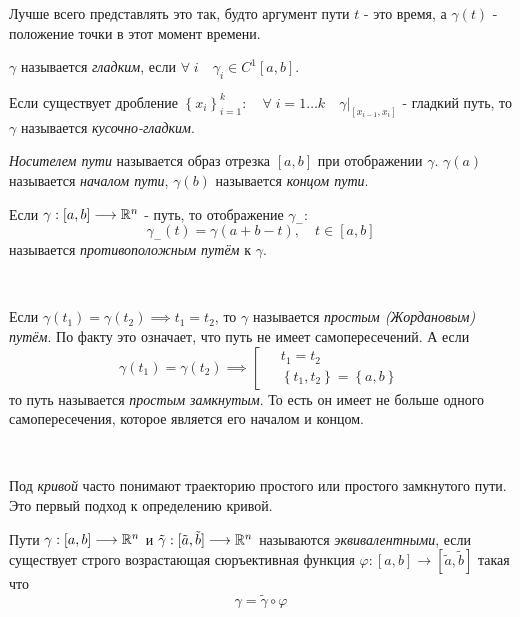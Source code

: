 \documentclass[../main.tex]{subfiles}
\begin{document}
Лучше всего представлять это так, будто аргумент пути \( t\) - это время, а \( \gamma \left( t\right)\) - положение точки в этот момент времени. 

\( \gamma \) называется \emph{гладким}, если \( \forall \;i\quad \gamma _i \in C^1\left[ a,b\right]\). 

Если существует дробление \( \left\{ x_i\right\}_{i=1}^k:\quad \forall \;i=1\dots k\quad \gamma |_{\left[ x_{i-1}, x_i\right]}\) - гладкий путь, то 
\( \gamma \) называется \emph{кусочно-гладким}.


\emph{Носителем пути} называется образ отрезка \( \left[ a,b\right]\) при отображении \( \gamma \).
\( \gamma \left( a\right)\) называется \emph{началом пути}, \( \gamma \left( b\right)\) называется \emph{концом пути}. 

Если \( \gamma :\left[ a,b\right] \longrightarrow \mathbb{R} ^n\) - путь, то отображение \( \gamma _-:\)\[\gamma _-(t)= \gamma \left( a+b-t\right),\quad t \in \left[ a,b\right]\]
называется \emph{противоположным путём} к \( \gamma \). 

~

Если \( \gamma \left( t_1\right)= \gamma \left( t_2\right) \implies t_1=t_2\), то \( \gamma \) называется \emph{простым (Жордановым) путём}. По факту это означает, что 
путь не имеет самопересечений. А если 
\begin{equation*}
    \gamma \left( t_1\right)= \gamma \left( t_2\right) \implies 
    \left[
    \begin{aligned}
        &\;t_1=t_2\\ 
        &\;\left\{ t_1,t_2\right\}=\left\{ a,b\right\}
    \end{aligned}
    \right.
\end{equation*}
то путь называется \emph{простым замкнутым}. То есть он имеет не больше одного самопересечения, которое является его началом и концом. 

~

Под \emph{кривой} часто понимают траекторию простого или простого замкнутого пути. Это первый подход к определению кривой.

Пути \( \gamma : \left[ a,b\right] \longrightarrow \mathbb{R} ^n\) и \( \tilde{ \gamma }: [ \tilde{a}, \tilde{b}] \longrightarrow \mathbb{R} ^n\) называются 
\emph{эквивалентными}, если существует строго возрастающая сюръективная функция \( \varphi :\left[ a,b\right] \longrightarrow [ \tilde{a}, \tilde{b}]\) такая что 
\[ \gamma = \tilde{ \gamma } \circ \varphi \]
\end{document}
